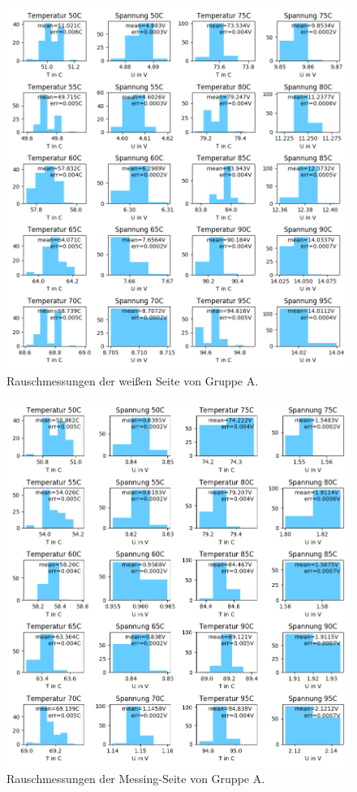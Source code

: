 \documentclass[12pt,a4paper]{article}
\begin{document}
\begin{figure}[h]
\includegraphics[scale=0.8]{Bilder/Rauschen_B_weiss_2.png}
\caption{Rauschmessungen der weißen Seite von Gruppe A.}
\label{fig:RegSpiegel}
\end{figure}

\begin{figure}[h]
\includegraphics[scale=0.8]{Bilder/Rauschen_B_messing_2.png}
\caption{Rauschmessungen der Messing-Seite von Gruppe A.}
\label{fig:RegSpiegel}
\end{figure}
\end{document}
